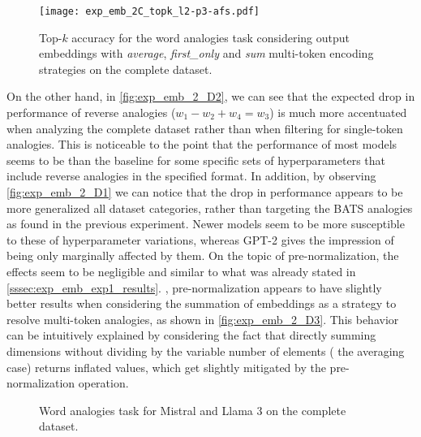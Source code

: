 \begin{figure}[t!]
    \centering
    \texttt{[image: exp\_emb\_2C\_topk\_l2-p3-afs.pdf]}
    \caption[Top-$k$ accuracy for the word analogies task considering output embeddings with different multi-token encoding strategies on the complete dataset.]{Top-$k$ accuracy for the word analogies task considering output embeddings with \emph{average}, \emph{first\_only} and \emph{sum} multi-token encoding strategies on the complete dataset.}
    \label{fig:exp_emb_2_C}
\end{figure}

On the other hand, in \cref{fig:exp_emb_2_D2}, we can see that the expected drop in performance of reverse analogies ($w_1 - w_2 + w_4 = w_3$) is much more accentuated when analyzing the complete dataset rather than when filtering for single-token analogies.
This is noticeable to the point that the performance of most models seems to be  than the baseline for some specific sets of hyperparameters that include reverse analogies in the specified format.
In addition, by observing \cref{fig:exp_emb_2_D1} we can notice that the drop in performance appears to be more generalized  all dataset categories, rather than targeting the BATS analogies as found in the previous experiment.
Newer models seem to be more susceptible to these  of hyperparameter variations, whereas GPT-2 gives the impression of being only marginally affected by them.
On the topic of pre-normalization, the effects seem to be negligible and similar to what was already stated in \cref{sssec:exp_emb_exp1_results}.
, pre-normalization appears to have slightly better results when considering the summation of embeddings as a strategy to resolve multi-token analogies, as shown in \cref{fig:exp_emb_2_D3}.
This behavior can be intuitively explained by considering the fact that directly summing dimensions without dividing by the variable number of elements ( the averaging case) returns inflated values, which get slightly mitigated by the pre-normalization operation.

\begin{figure}[t!]
    \centering
    \quad
    \begingroup
    \captionsetup{width=0.9\textwidth/2}
    \endgroup
    \caption{Word analogies task for Mistral and Llama 3 on the complete dataset.}
    \label{fig:exp_emb_2_D}
\end{figure}

